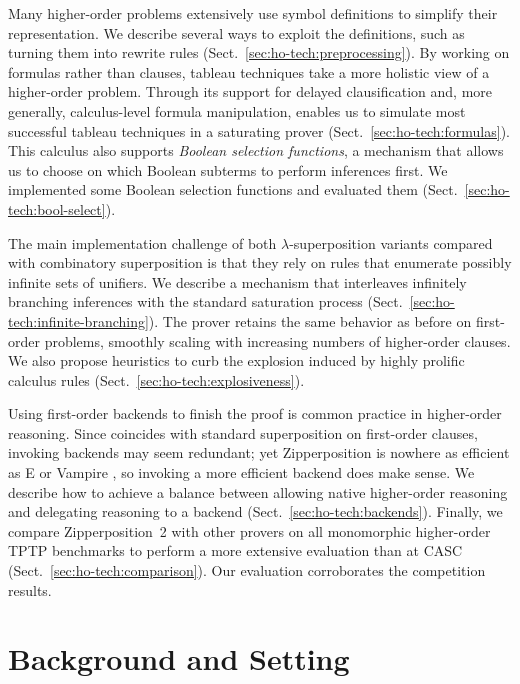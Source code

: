 Many higher-order problems extensively use symbol definitions to simplify
their representation. We describe several ways to exploit the definitions,
such as turning them into rewrite rules (Sect.~\ref{sec:ho-tech:preprocessing}).
%
By working on formulas rather than clauses, tableau techniques take a more
holistic view of a higher-order problem.
Through its support for delayed clausification and, more generally,
calculus-level formula manipulation, \osup{} enables us to
simulate most successful tableau techniques in a saturating prover
(Sect.~\ref{sec:ho-tech:formulas}). This calculus also supports \emph{Boolean selection
functions}, a mechanism that allows us to choose on which Boolean subterms
to perform inferences first.
We implemented some Boolean selection functions and
evaluated them (Sect.~\ref{sec:ho-tech:bool-select}).

The main implementation challenge of both $\lambda$-superposition variants compared with
combinatory superposition is that they rely on rules that enumerate possibly
infinite sets of unifiers. We describe a mechanism that interleaves infinitely
branching inferences with the standard saturation process
(Sect.~\ref{sec:ho-tech:infinite-branching}). The prover retains the same
behavior as before on first-order problems, smoothly scaling with increasing
numbers of higher-order clauses.
%
We also propose heuristics to curb the explosion induced by highly
prolific calculus rules (Sect.~\ref{sec:ho-tech:explosiveness}).

Using first-order backends to finish the proof is common practice in
higher-order reasoning. Since \osup{} coincides with standard
superposition on first-order clauses, invoking backends may
seem redundant; yet Zipperposition is nowhere as efficient as E
\cite{scv-19-e23} or Vampire \cite{lkav-13-vampire}, so invoking a more
efficient backend does make sense. We describe how to achieve a balance
between allowing native higher-order reasoning and
delegating reasoning to a backend (Sect.~\ref{sec:ho-tech:backends}).
%
Finally, we compare Zipperposition~2 with other provers on all monomorphic
higher-order TPTP benchmarks \cite{gs-17-tptp} to perform a more extensive
evaluation than at CASC (Sect.~\ref{sec:ho-tech:comparison}). Our evaluation
corroborates the competition results.

\section{Background and Setting}
\label{sec:ho-tech:background}

